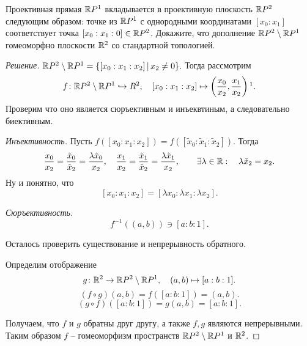 \documentclass[10pt]{article}
\begin{document}
\begin{tasks}
	
	
	 \item Проективная прямая $\mathbb R P^1$ вкладывается в проективную плоскость $\mathbb R P^2$ следующим образом: точке из $\mathbb R P^1$ с однородными координатами $[x_0:x_1]$ соответствует точка $[x_0:x_1:0]\in \mathbb R P^2$. Докажите, что дополнение $\mathbb R P^2\setminus \mathbb R P^1$ гомеоморфно плоскости $\mathbb R^2$ со стандартной топологией.
	
	\begin{proof}
		[Решение] 
		$\mathbb R P^2 \setminus \mathbb R P^1 = \{[x_0:x_1:x_2]\,|\, x_2 \neq 0\}.$ Тогда рассмотрим $$f \colon \R P^2 \setminus \R P^1 \hookrightarrow R^2, \quad [x_0:x_1:x_2] \mapsto \left( \frac{x_0}{x_2}, \frac{x_1}{x_2}\right)\footnotemark.$$
		Проверим что оно является сюръективным и инъеквтиным, а следовательно биективным.
		\begin{conditions}
			\item \textit{Инъективность.} Пусть $f([x_0:x_1:x_2]) = f([\tilde x_0 : \tilde x_1 : \tilde x_2])$. Тогда \[\frac{x_0}{x_2} = \frac{\tilde x_0}{\tilde x_2} = \frac{\lambda \tilde x_0}{x_2}, \quad \frac{x_1}{x_2} = \frac{\tilde x_1}{\tilde x_2}  = \frac{\lambda \tilde x_1}{x_2},\qquad \exists \lambda \in \mathbb R: \quad \lambda \tilde x_2 = x_2.\]
			Ну и понятно, что \[[x_0: x_1:x_2] = [\lambda x_0:\lambda x_1 :\lambda x_2].\]
			\item \textit{Сюръективность.} \[f^{-1}((a, b)) \ni [a : b : 1].\]
		\end{conditions}
		Осталось проверить существование и непрерывность обратного.
		
		Определим отображение $$g \colon \mathbb R^2 \to \mathbb R P^2 \setminus \mathbb R P^1, \quad (a,b) \mapsto [a:b:1].$$
		\[(f\circ g)(a,b) = f([a:b:1]) = (a,b).\]
		\[(g\circ f)([a:b:1]) = g(a,b) = [a:b:1].\]
		
		Получаем, что $f$ и $g$ обратны друг другу, а также $f, g$ являются непрерывными. Таким образом $f$ -- гомеоморфизм пространств $\mathbb R P^2 \setminus \mathbb R P^1$ и $\mathbb R^2$.
	\end{proof}
	
\end{tasks}
\end{document}
